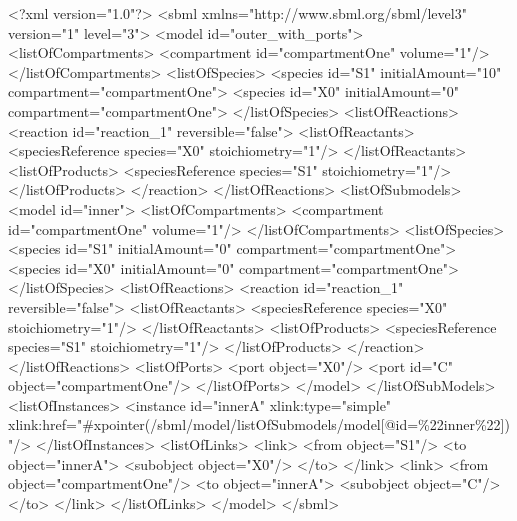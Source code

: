 \documentclass{cekarticle}
\begin{document}
\begin{example}
<?xml version="1.0"?>
<sbml xmlns="http://www.sbml.org/sbml/level3" version="1" level="3">
    <model id="outer_with_ports">
        <listOfCompartments>
            <compartment id="compartmentOne" volume="1"/>
        </listOfCompartments>
        <listOfSpecies>
            <species id="S1" initialAmount="10" compartment="compartmentOne">
            <species id="X0" initialAmount="0" compartment="compartmentOne">
        </listOfSpecies>
        <listOfReactions>
            <reaction id="reaction_1" reversible="false">
                <listOfReactants>
                    <speciesReference species="X0" stoichiometry="1"/>
                </listOfReactants>
                <listOfProducts>
                    <speciesReference species="S1" stoichiometry="1"/>
                </listOfProducts>
            </reaction>
        </listOfReactions>
        <listOfSubmodels>
            <model id="inner">
                <listOfCompartments>
                    <compartment id="compartmentOne" volume="1"/>
                </listOfCompartments>
                <listOfSpecies>
                    <species id="S1" initialAmount="0" compartment="compartmentOne">
                    <species id="X0" initialAmount="0" compartment="compartmentOne">
                </listOfSpecies>
                <listOfReactions>
                    <reaction id="reaction_1" reversible="false">
                        <listOfReactants>
                            <speciesReference species="X0" stoichiometry="1"/>
                        </listOfReactants>
                        <listOfProducts>
                            <speciesReference species="S1" stoichiometry="1"/>
                        </listOfProducts>
                    </reaction>
                </listOfReactions>
                <listOfPorts>
                    <port object="X0"/>
                    <port id="C" object="compartmentOne"/>
                </listOfPorts>
            </model>
        </listOfSubModels>
        <listOfInstances>
            <instance
                id="innerA" 
                xlink:type="simple"
                xlink:href="#xpointer(/sbml/model/listOfSubmodels/model[@id=\%22inner\%22])"/>
        </listOfInstances>
        <listOfLinks>
            <link>
                <from object="S1"/>
                <to object="innerA">
                    <subobject object="X0"/>
                </to>
            </link>
            <link>
                <from object="compartmentOne"/>
                <to object="innerA">
                    <subobject object="C"/>
                </to>
            </link>
        </listOfLinks>
    </model>
</sbml>
\end{example}




\end{document}
